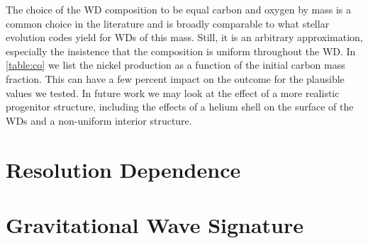 \documentclass[twocolumn,numberedappendix]{../aastex6}
\begin{document}

The choice of the WD composition to be equal carbon and oxygen by mass is a common
choice in the literature and is broadly comparable to what stellar evolution codes
yield for WDs of this mass. Still, it is an arbitrary approximation, especially the
insistence that the composition is uniform throughout the WD. In \autoref{table:co}
we list the nickel production as a function of the initial carbon mass fraction.
This can have a few percent impact on the outcome for the plausible values we tested.
In future work we may look at the effect of a more realistic progenitor structure,
including the effects of a helium shell on the surface of the WDs \citep{holcomb:2015}
and a non-uniform interior structure.





\section{Resolution Dependence}
\label{sec:resolution}



\section{Gravitational Wave Signature}
\label{sec:gwsignature}
\end{document}
